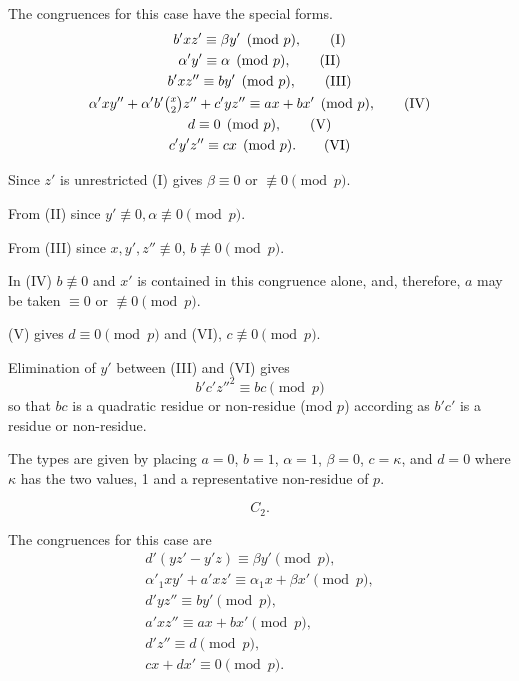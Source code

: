 \documentclass[oneside]{article}
\begin{document}
The congruences for this case have the special forms.
\begin{gather*}
b'xz' \equiv \beta y' \pmod{p},                                            \tag{I} \\
\alpha'y' \equiv \alpha \pmod{p},                                          \tag{II} \\
b'xz'' \equiv by' \pmod{p},                                                \tag{III} \\
\alpha'xy'' + \alpha'b'\tbinom{x}{2}z'' + c'yz'' \equiv ax + bx' \pmod{p}, \tag{IV} \\
d \equiv 0 \pmod{p},                                                       \tag{V} \\
c'y'z'' \equiv cx \pmod{p}.                                                \tag{VI}
\end{gather*}

Since $z'$ is unrestricted (I) gives $\beta \equiv 0$ or $\not\equiv 0 \pmod{p}$.

From (II) since $y' \not\equiv 0, \alpha \not\equiv 0 \pmod{p}$.

From (III) since $x, y', z'' \not\equiv 0$, $b \not\equiv 0 \pmod{p}$.

In (IV) $b \not\equiv 0$ and $x'$ is contained in this congruence alone,
and, therefore, $a$ may be taken $\equiv 0$ or $\not\equiv 0 \pmod{p}$.

(V) gives $d \equiv 0 \pmod{p}$ and (VI), $c \not\equiv 0 \pmod{p}$.

Elimination of $y'$ between (III) and (VI) gives
\begin{equation*}
b'c'z''^{2} \equiv bc \pmod{p}
\end{equation*}
\noindent so that $bc$ is a quadratic residue or non-residue (mod $p$)
according as $b'c'$ is a residue or non-residue.

The types are given by placing $a = 0$, $b = 1$, $\alpha = 1$, $\beta = 0$,
$c = \kappa$, and $d = 0$ where $\kappa$ has the two values, 1 and a
representative non-residue of $p$.

\medskip
\begin{equation*} C_2. \end{equation*}

The congruences for this case are
\begin{gather*}
d'(yz' - y'z) \equiv \beta y' \pmod{p},                      \tag{I} \\
\alpha'_1 xy' + a'xz' \equiv \alpha_1 x + \beta x' \pmod{p}, \tag{II} \\
d'yz'' \equiv by' \pmod{p},                                  \tag{III} \\
a'xz'' \equiv ax + bx' \pmod{p},                             \tag{IV} \\
d'z'' \equiv d \pmod{p},                                     \tag{V} \\
cx + dx' \equiv 0 \pmod{p}.                                  \tag{VI}
\end{gather*}
\end{document}
